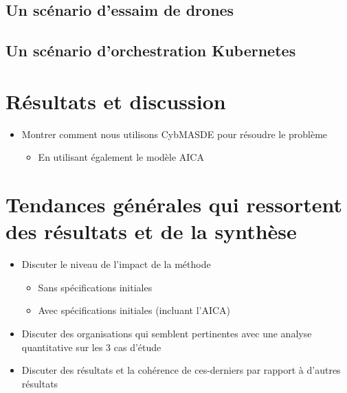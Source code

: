 \subsection{Un scénario d'essaim de drones}
\subsection{Un scénario d'orchestration Kubernetes}


\section{Résultats et discussion}
\begin{itemize}

    \item Montrer comment nous utilisons CybMASDE pour résoudre le problème
          \begin{itemize}
              \item En utilisant également le modèle AICA
          \end{itemize}
\end{itemize}

\section{Tendances générales qui ressortent des résultats et de la synthèse}
\begin{itemize}
    \item Discuter le niveau de l'impact de la méthode
          \begin{itemize}
              \item Sans spécifications initiales
              \item Avec spécifications initiales (incluant l'AICA)
          \end{itemize}
    \item Discuter des organisations qui semblent pertinentes avec une analyse quantitative sur les 3 cas d'étude
    \item Discuter des résultats et la cohérence de ces-derniers par rapport à d'autres résultats
\end{itemize}